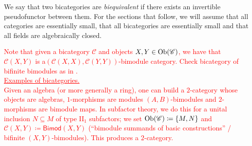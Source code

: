 \noindent We say that two bicategories are {\em biequivalent} if there exists an invertible pseudofunctor between them. For the sections that follow, we will assume that all categories are essentially small, that all bicategories are essentially small and that all fields are algebraically closed.
\newpage



\noindent\textcolor{red}{Note that given a bicategory $\mathscr{C}$ and objects $X, Y \in \textnormal{Ob}(\mathscr{C})$, we have that $\mathscr{C}(X, Y)$ is a\linebreak $(\mathscr{C}(X, X), \mathscr{C}(Y, Y))$-bimodule category. Check bicategory of bifinite bimodules as in \cite{DGG14}.}\\

\noindent\textcolor{red}{\underline{Examples of bicategories.}}\\

\noindent\textcolor{red}{Given an algebra (or more generally a ring), one can build a $2$-category whose objects are algebras, $1$-morphisms are modules $(A, B)$-bimodules and $2$-morphisms are bimodule maps. In subfactor theory, we do this for a unital inclusion $N \subseteq M$ of type II$_1$ subfactors; we set $\textnormal{Ob}(\mathscr{C}) \coloneqq \{M, N\}$ and $\mathscr{C}(X, Y) \coloneqq \textsf{Bimod}(X, Y)$ (``bimodule summands of basic constructions'' / bifinite $(X, Y)$-bimodules). This produces a $2$-category.}\\

